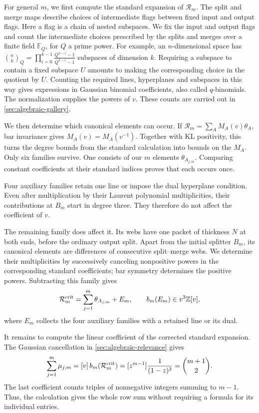 \documentclass[a4paper,11pt]{amsart}
\numberwithin{equation}{subsection}
\theoremstyle{plain}
\theoremstyle{definition}
\theoremstyle{remark}
\newcommand{\gbinom}[2]{\binom{#1}{#2}}
\begin{document}
For general $m$, we first compute the standard expansion of
$\mathcal R_m$. The split and merge maps describe choices of
intermediate flags between fixed input and output flags.
Here a flag is a chain of nested subspaces. We fix the input
and output flags and count the intermediate choices prescribed
by the splits and merges over a finite field $\mathbb F_Q$, for $Q$ a prime power.
For example, an $n$-dimensional space has $\gbinom{n}{k}_Q=\prod_{i=0}^{k-1}\frac{Q^{n-i}-1}{Q^{k-i}-1}$
subspaces of dimension $k$. Requiring a subspace to contain
a fixed subspace $U$ amounts to making the corresponding
choice in the quotient by $U$. Counting the required lines,
hyperplanes and subspaces in this way gives expressions in
Gaussian binomial coefficients, also called $q$-binomials.
The normalization supplies the powers of $v$.
These counts are carried out in \autoref{sec:algebraic-gallery}.

We then determine which canonical elements can occur.
If $\mathcal R_m=\sum_A M_A(v)\theta_A$, bar invariance gives
$M_A(v)=M_A(v^{-1})$. Together with KL positivity, this turns the
degree bounds from the standard calculation into bounds on the
$M_A$. Only six families survive.
One consists of our $m$ elements $\theta_{A_{j;m}}$.
Comparing constant coefficients at their standard indices proves
that each occurs once.

Four auxiliary families retain one line or impose the dual
hyperplane condition. Even after multiplication by their
Laurent polynomial multiplicities, their contributions at $B_m$
start in degree three. They therefore do not affect the
coefficient of $v$.

The remaining family does affect it. Its webs have one packet
of thickness $N$ at both ends, before the ordinary output split.
Apart from the initial splitter $B_m$, its canonical elements
are differences of consecutive split--merge webs.
We determine their multiplicities by successively canceling
nonpositive powers in the corresponding standard coefficients;
bar symmetry determines the positive powers.
Subtracting this family gives
\[
\mathcal R_m^{\rm crit}
=\sum_{j=1}^{m}\theta_{A_{j;m}}+E_m,
\qquad b_m(E_m)\in v^3\mathbb Z[v],
\]
where $E_m$ collects the four auxiliary families with a retained
line or its dual.

It remains to compute the linear coefficient of the corrected
standard expansion. The Gaussian cancellation in
\autoref{sec:algebraic-relevance} gives
\[
\sum_{j=1}^{m}\mu_{j;m}
=[v]\,b_m(\mathcal R_m^{\rm crit})
=[z^{m-1}]\frac{1}{(1-z)^3}
=\binom{m+1}{2}.
\]
The last coefficient counts triples of nonnegative integers
summing to $m-1$. Thus, the calculation gives the whole row sum
without requiring a formula for its individual entries.
\end{document}
